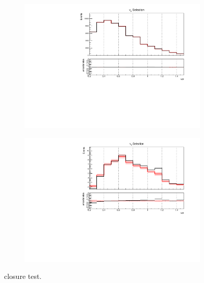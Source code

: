 \documentclass[a4paper]{article}
\begin{document}
\begin{figure}[H]
\begin{subfigure}[b]{0.45\textwidth}
        \includegraphics[width=\textwidth]{ConstraintClosureTests/2sigma_up/nuenumu_reco_e_H0_dataconstraint_All_GenieAll_Genie_scaled_numu.pdf}
        \end{subfigure}  
        \begin{subfigure}[b]{0.45\textwidth}
        \centering
        \includegraphics[width=\textwidth]{ConstraintClosureTests/2sigma_up/nuenumu_reco_e_H0_dataconstraint_All_GenieAll_Genie_univ_overlay_nue.pdf}
        \end{subfigure}
    \caption{closure test.}
    \label{fig::app:closure:2sigmaup}
\end{figure}

\newpage



\newpage
\end{document}
